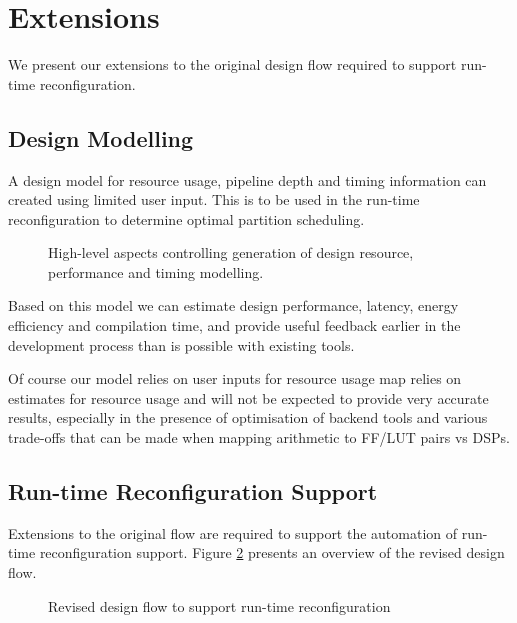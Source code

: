 

\section{Extensions}

We present our extensions to the original design flow required to
support run-time reconfiguration.

\subsection{Design Modelling}

A design model for resource usage, pipeline depth and timing
information can created using limited user input. This is to be used
in the run-time reconfiguration to determine optimal partition
scheduling.

\begin{figure}[!ht]
  \centering
  \def\svgwidth{\textwidth}
  
  \caption{High-level aspects controlling generation of design
    resource, performance and timing modelling.}
  \label{fig:reconfig-design-flow}
\end{figure}

Based on this model we can estimate design performance, latency,
energy efficiency and compilation time, and provide useful feedback
earlier in the development process than is possible with existing
tools.

Of course our model relies on user inputs for resource usage map
relies on estimates for resource usage and will not be expected to
provide very accurate results, especially in the presence of
optimisation of backend tools and various trade-offs that can be made
when mapping arithmetic to FF/LUT pairs vs DSPs.

\subsection{Run-time Reconfiguration Support}

Extensions to the original flow are required to support the automation
of run-time reconfiguration support. Figure
\ref{fig:reconfig-design-flow} presents an overview of the revised
design flow.

\begin{figure}[!ht]
  \centering
  \def\svgwidth{\textwidth}
  
  \caption{Revised design flow to support run-time reconfiguration}
  \label{fig:reconfig-design-flow}
\end{figure}

